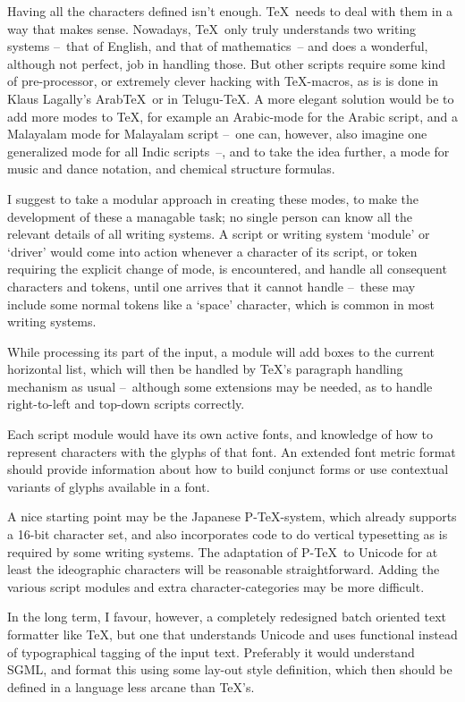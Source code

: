 Having all the characters defined isn't enough. \TeX\ needs to deal 
with them in a way that makes sense. Nowadays, \TeX\ only truly 
understands two writing systems --~that of English, and that of 
mathematics~-- and does a wonderful, although not perfect, job in 
handling those. But other scripts require some kind of pre-processor, 
or extremely clever hacking with \TeX-macros, as is is done in Klaus 
Lagally's Arab\TeX\ or in Telugu-\TeX. A more elegant solution would 
be to add more modes to \TeX, for example an Arabic-mode for the 
Arabic script, and a Malayalam mode for Malayalam script --~one can, 
however, also imagine one generalized mode for all Indic scripts~--, 
and to take the idea further, a mode for music and dance notation, and 
chemical structure formulas.

I suggest to take a modular approach in creating these modes, to make 
the development of these a managable task; no single person can know 
all the relevant details of all writing systems. A script or writing 
system `module' or `driver' would come into action whenever a 
character of its script, or token requiring the explicit change of 
mode, is encountered, and handle all consequent characters and tokens, 
until one arrives that it cannot handle --~these may include some 
normal tokens like a `space' character, which is common in most 
writing systems.

While processing its part of the input, a module will add boxes to the 
current horizontal list, which will then be handled by \TeX's 
paragraph handling mechanism as usual --~although some extensions may 
be needed, as to handle right-to-left and top-down scripts correctly.

Each script module would have its own active fonts, and knowledge of 
how to represent characters with the glyphs of that font. An extended 
font metric format should provide information about how to build 
conjunct forms or use contextual variants of glyphs available in a 
font.

A nice starting point may be the Japanese P-\TeX-system, which already 
supports a 16-bit character set, and also incorporates code to do 
vertical typesetting as is required by some writing systems. The 
adaptation of P-\TeX\ to Unicode for at least the ideographic 
characters will be reasonable straightforward. Adding the various 
script modules and extra character-categories may be more difficult.

In the long term, I favour, however, a completely redesigned batch 
oriented text formatter like \TeX, but one that understands Unicode 
and uses functional instead of typographical tagging of the input 
text. Preferably it would understand SGML, and format this using some 
lay-out style definition, which then should be defined in a language 
less arcane than \TeX's.

